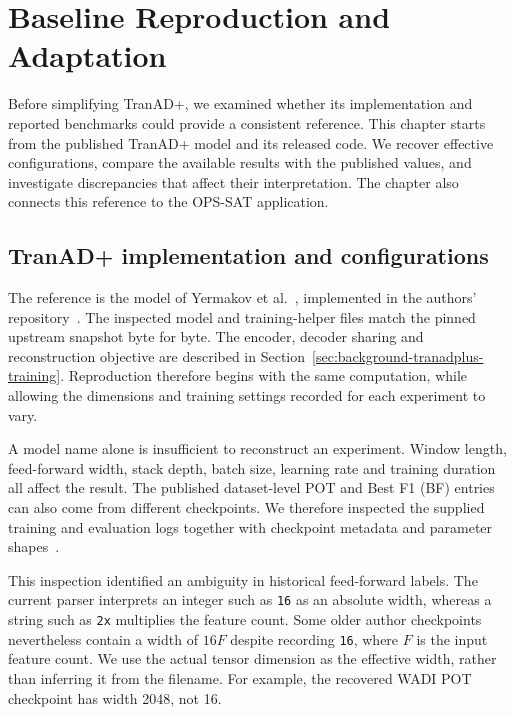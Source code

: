 \chapter{Baseline Reproduction and Adaptation}
\label{chap:replication}

Before simplifying TranAD+, we examined whether its implementation and
reported benchmarks could provide a consistent reference. This chapter
starts from the published TranAD+ model and its released code. We recover
effective configurations, compare the available results with the published
values, and investigate discrepancies that affect their interpretation.
The chapter also connects this reference to the \ac{OPS-SAT} application.

\section{TranAD+ implementation and configurations}
\label{sec:replication-tranadplus}
The reference is the model of Yermakov et al.~\cite{Yermakov2025TranADPlus},
implemented in the authors' repository~\cite{TranADPlusReferenceCode}.
The inspected model and training-helper files match the pinned upstream
snapshot byte for byte. The encoder, decoder sharing and reconstruction
objective are described in Section~\ref{sec:background-tranadplus-training}.
Reproduction therefore begins with the same computation, while allowing
the dimensions and training settings recorded for each experiment to vary.

A model name alone is insufficient to reconstruct an experiment. Window
length, feed-forward width, stack depth, batch size, learning rate and
training duration all affect the result. The published dataset-level
\ac{POT} and Best F1 (BF) entries can also come from different checkpoints.
We therefore inspected the supplied training and evaluation logs together
with checkpoint metadata and parameter shapes~\cite{TranADPlusReferenceCode}.

This inspection identified an ambiguity in historical feed-forward labels.
The current parser interprets an integer such as \texttt{16} as an
absolute width, whereas a string such as \texttt{2x} multiplies the feature
count. Some older author checkpoints nevertheless contain a width of
\(16F\) despite recording \texttt{16}, where \(F\) is the input feature
count. We use the actual tensor dimension as the effective width, rather
than inferring it from the filename. For example, the recovered WADI
\ac{POT} checkpoint has width \num{2048}, not \num{16}.

